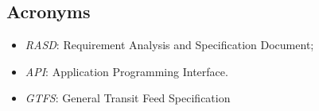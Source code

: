 \subsection{Acronyms}
	\begin{itemize}
	\item \textit{RASD}: Requirement Analysis and Specification Document;
	\item \textit{API}: Application Programming Interface.
	\item \textit{GTFS}: General Transit Feed Specification
	\end{itemize}